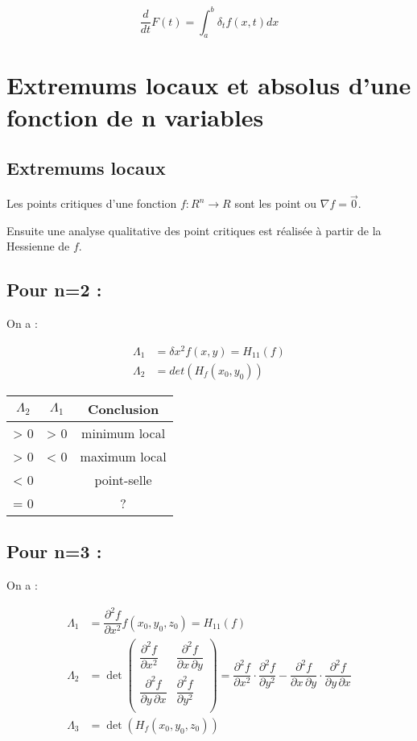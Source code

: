 \documentclass[12pt,a4paper]{report}
\begin{document}
$$\frac{d}{dt} F(t) = \int_a^b \delta_t f(x,t)dx$$

\section{Extremums locaux et absolus d'une fonction de n variables}

\subsection{Extremums locaux}
Les points critiques d'une fonction $f : R^n \to R$ sont les point ou $\nabla f = \vec{0}$.

Ensuite une analyse qualitative des point critiques est réalisée à partir de la Hessienne de $f$. \\

\subsection{Pour n=2 :}

On a :

\begin{align*}
\Lambda_1 &= \delta x^2 f(x,y)  = H_{11}(f)\\
\Lambda_2 &= det(H_f(x_0,y_0)) 
\end{align*}

\begin{center}
\begin{tabular}{c|c|c}
$\Lambda_2$ & $\Lambda_1$ & Conclusion \\ 
\hline
> 0 & > 0 & minimum local \\ 
> 0 & < 0 & maximum local \\ 
< 0 &  & point-selle \\ 
= 0 &  & ? \\ 
\end{tabular} 
\end{center}

\subsection{Pour n=3 :}

On a :

\begin{align*}
\Lambda_1 &= \dfrac{\partial^2 f}{\partial x^2} f(x_0,y_0,z_0)  = H_{11}(f)\\
\Lambda_2 &= \det\begin{pmatrix}
  \dfrac{\partial^2 f}{\partial x^2} & \dfrac{\partial^2 f}{\partial x\,\partial y}\\
  \dfrac{\partial^2 f}{\partial y\,\partial x} & \dfrac{\partial^2 f}{\partial y^2} \\[2.2ex]
\end{pmatrix} = \dfrac{\partial^2 f}{\partial x^2} \cdot \dfrac{\partial^2 f}{\partial y^2} - \dfrac{\partial^2 f}{\partial x\,\partial y} \cdot \dfrac{\partial^2 f}{\partial y\,\partial x}\\
\Lambda_3 &= \det(H_f(x_0,y_0,z_0)) 
\end{align*}
\end{document}
